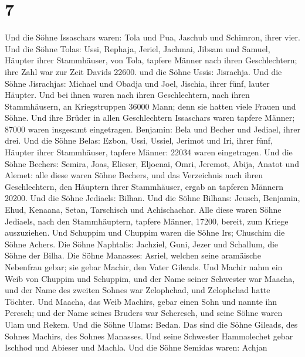 \hypertarget{section-6}{%
\section{7}\label{section-6}}

 Und die Söhne Issaschars waren: Tola und Pua, Jaschub und
Schimron, ihrer vier.  Und die Söhne Tolas: Ussi, Rephaja,
Jeriel, Jachmai, Jibsam und Samuel, Häupter ihrer Stammhäuser, von Tola,
tapfere Männer nach ihren Geschlechtern; ihre Zahl war zur Zeit Davids
22600.  und die Söhne Ussis: Jisrachja. Und die Söhne
Jisrachjas: Michael und Obadja und Joel, Jischia, ihrer fünf, lauter
Häupter.  Und bei ihnen waren nach ihren Geschlechtern,
nach ihren Stammhäusern, an Kriegstruppen 36000 Mann; denn sie hatten
viele Frauen und Söhne.  Und ihre Brüder in allen
Geschlechtern Issaschars waren tapfere Männer; 87000 waren insgesamt
eingetragen.  Benjamin: Bela und Becher und Jediael, ihrer
drei.  Und die Söhne Belas: Ezbon, Ussi, Ussiel, Jerimot
und Iri, ihrer fünf, Häupter ihrer Stammhäuser, tapfere Männer: 22034
waren eingetragen.  Und die Söhne Bechers: Semira, Joas,
Elieser, Eljoenai, Omri, Jeremot, Abija, Anatot und Alemet: alle diese
waren Söhne Bechers,  und das Verzeichnis nach ihren
Geschlechtern, den Häuptern ihrer Stammhäuser, ergab an tapferen Männern
20200. Und die Söhne Jediaels: Bilhan.  Und die Söhne
Bilhans: Jeusch, Benjamin, Ehud, Kenaana, Setan, Tarschisch und
Achischachar.  Alle diese waren Söhne Jediaels, nach den
Stammhäuptern, tapfere Männer, 17200, bereit, zum Kriege auszuziehen.
 Und Schuppim und Chuppim waren die Söhne Irs; Chuschim
die Söhne Achers.  Die Söhne Naphtalis: Jachziel, Guni,
Jezer und Schallum, die Söhne der Bilha.  Die Söhne
Manasses: Asriel, welchen seine aramäische Nebenfrau gebar; sie gebar
Machir, den Vater Gileads.  Und Machir nahm ein Weib von
Chuppim und Schuppim, und der Name seiner Schwester war Maacha, und der
Name des zweiten Sohnes war Zelophchad, und Zelophchad hatte Töchter.
 Und Maacha, das Weib Machirs, gebar einen Sohn und
nannte ihn Peresch; und der Name seines Bruders war Scheresch, und seine
Söhne waren Ulam und Rekem.  Und die Söhne Ulams: Bedan.
Das sind die Söhne Gileads, des Sohnes Machirs, des Sohnes Manasses.
 Und seine Schwester Hammolechet gebar Ischhod und
Abieser und Machla.  Und die Söhne Semidas waren: Achjan
